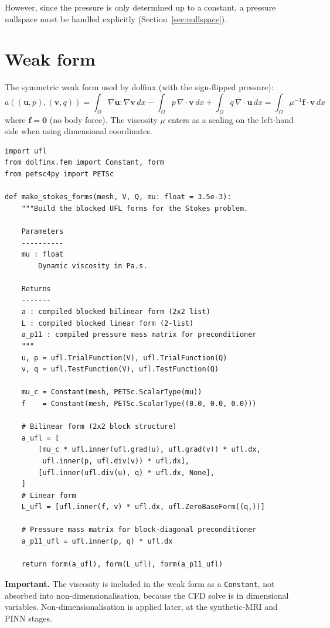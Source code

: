 \documentclass[11pt]{article}
\begin{document}
However, since the pressure is only determined up to a constant, a
pressure nullspace must be handled explicitly (Section~\ref{sec:nullspace}).

\section{Weak form}

The symmetric weak form used by dolfinx (with the sign-flipped pressure):
\[
  a((\mathbf{u},p), (\mathbf{v},q))
    = \int_\Omega \nabla\mathbf{u}:\nabla\mathbf{v}\,dx
    - \int_\Omega p\,\nabla\cdot\mathbf{v}\,dx
    + \int_\Omega q\,\nabla\cdot\mathbf{u}\,dx
    = \int_\Omega \mu^{-1}\mathbf{f}\cdot\mathbf{v}\,dx
\]
where $\mathbf{f}=\mathbf{0}$ (no body force). The viscosity $\mu$ enters
as a scaling on the left-hand side when using dimensional coordinates.

\begin{lstlisting}
import ufl
from dolfinx.fem import Constant, form
from petsc4py import PETSc

def make_stokes_forms(mesh, V, Q, mu: float = 3.5e-3):
    """Build the blocked UFL forms for the Stokes problem.

    Parameters
    ----------
    mu : float
        Dynamic viscosity in Pa.s.

    Returns
    -------
    a : compiled blocked bilinear form (2x2 list)
    L : compiled blocked linear form (2-list)
    a_p11 : compiled pressure mass matrix for preconditioner
    """
    u, p = ufl.TrialFunction(V), ufl.TrialFunction(Q)
    v, q = ufl.TestFunction(V), ufl.TestFunction(Q)

    mu_c = Constant(mesh, PETSc.ScalarType(mu))
    f    = Constant(mesh, PETSc.ScalarType((0.0, 0.0, 0.0)))

    # Bilinear form (2x2 block structure)
    a_ufl = [
        [mu_c * ufl.inner(ufl.grad(u), ufl.grad(v)) * ufl.dx,
         ufl.inner(p, ufl.div(v)) * ufl.dx],
        [ufl.inner(ufl.div(u), q) * ufl.dx, None],
    ]
    # Linear form
    L_ufl = [ufl.inner(f, v) * ufl.dx, ufl.ZeroBaseForm((q,))]

    # Pressure mass matrix for block-diagonal preconditioner
    a_p11_ufl = ufl.inner(p, q) * ufl.dx

    return form(a_ufl), form(L_ufl), form(a_p11_ufl)
\end{lstlisting}

\textbf{Important.} The viscosity is included in the weak form as a
\texttt{Constant}, not absorbed into non-dimensionalisation, because the
CFD solve is in dimensional variables. Non-dimensionalisation is applied
later, at the synthetic-MRI and PINN stages.
\end{document}
